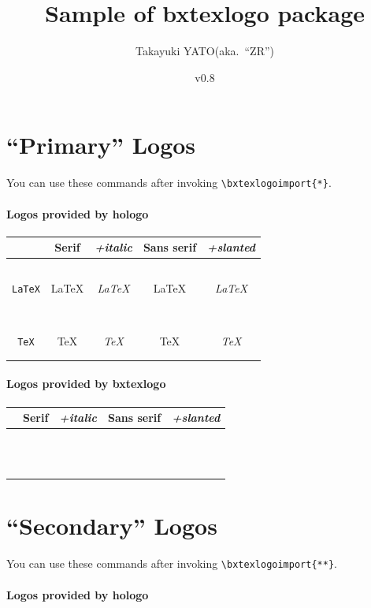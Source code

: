 \documentclass[a4paper]{article}
\newcommand{\PkgVersion}{0.8}
\newcommand{\PkgDate}{2026/05/23}
\newcommand{\Pkg}[1]{\textsf{#1}}
\newenvironment{LogoSamples}{%
  \begin{center}\begin{tabular}{ccccc}
    \hline \phantom{\LARGE I}
        & \textrm{Serif} & \textit{+italic}
        & \textsf{Sans serif} & \textsl{+slanted}
    \\\hline
}{%
    \hline
  \end{tabular}\end{center}
}
\newcommand*{\LSEntry}[1]{%
  \texttt{\string#1} & \textrm{#1} & \textit{#1}
      & \textsf{#1} & \textsf{\textsl{#1}}
  \\}
\begin{document}
\title{Sample of \Pkg{bxtexlogo} package}
\author{Takayuki YATO\quad (aka.~``ZR'')}
\date{v\PkgVersion \quad[\PkgDate]}
\maketitle

\section{``Primary'' Logos}

You can use these commands after invoking
\verb|\bxtexlogoimport{*}|.

\paragraph{Logos provided by \Pkg{hologo}}\mbox{}

\begin{LogoSamples}
\LSEntry{\AmSLaTeX}
\LSEntry{\AmSTeX}
\LSEntry{\BibTeX}
\LSEntry{\ConTeXt}
\LSEntry{\eTeX}
\LSEntry{\LaTeX}
\LSEntry{\LaTeXe}
\LSEntry{\LuaLaTeX}
\LSEntry{\LuaTeX}
\LSEntry{\LyX}
\LSEntry{\METAFONT}
\LSEntry{\METAPOST}
\LSEntry{\pdfTeX}
\LSEntry{\pdfLaTeX}
\LSEntry{\TeX}
\LSEntry{\XeLaTeX}
\LSEntry{\XeTeX}
\end{LogoSamples}

\paragraph{Logos provided by \Pkg{bxtexlogo}}\mbox{}

\begin{LogoSamples}
\LSEntry{\epTeX}
\LSEntry{\eupTeX}
\LSEntry{\JBibTeX}
\LSEntry{\pBibTeX}
\LSEntry{\pLaTeXe}
\LSEntry{\pLaTeX}
\LSEntry{\pTeX}
\LSEntry{\TikZ}
\LSEntry{\upBibTeX}
\LSEntry{\upLaTeX}
\LSEntry{\upLaTeXe}
\LSEntry{\upTeX}
\end{LogoSamples}

\newpage
\section{``Secondary'' Logos}

You can use these commands after invoking
\verb|\bxtexlogoimport{**}|.

\paragraph{Logos provided by \Pkg{hologo}}\mbox{}
\end{document}
